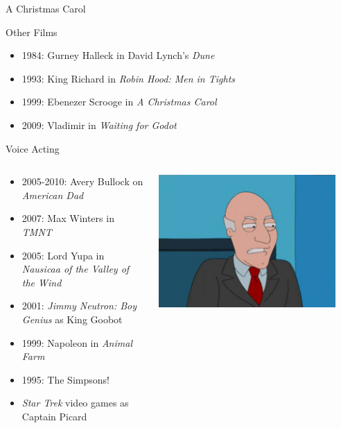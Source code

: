 \documentclass[xcolor=dvipsnames]{beamer}
\begin{document}
\begin{frame}{A Christmas Carol}

\end{frame}

\begin{frame}{Other Films}
  \begin{itemize}
    \item 1984: Gurney Halleck in David Lynch's \emph{Dune}
    \item 1993: King Richard in \emph{Robin Hood: Men in Tights}
    \item 1999: Ebenezer Scrooge in \emph{A Christmas Carol}
    \item 2009: Vladimir in \emph{Waiting for Godot}
  \end{itemize}
\end{frame}

\begin{frame}{Voice Acting}
  \begin{columns}
    \begin{column}{0.7\textwidth}
      \begin{itemize} 
        \item 2005-2010: Avery Bullock on \emph{American Dad}
        \item 2007: Max Winters in \emph{TMNT}
        \item 2005: Lord Yupa in \emph{Nausicaa of the Valley of the Wind}
        \item 2001: \emph{Jimmy Neutron: Boy Genius} as King Goobot
        \item 1999: Napoleon in \emph{Animal Farm}
        \item 1995: The Simpsons!
        \item \emph{Star Trek} video games as Captain Picard
      \end{itemize}
    \end{column}
    \begin{column}{0.3\textwidth}
      \includegraphics[width=0.9\textwidth]{Bullock.jpg}
    \end{column}
  \end{columns}
\end{frame}
\end{document}

